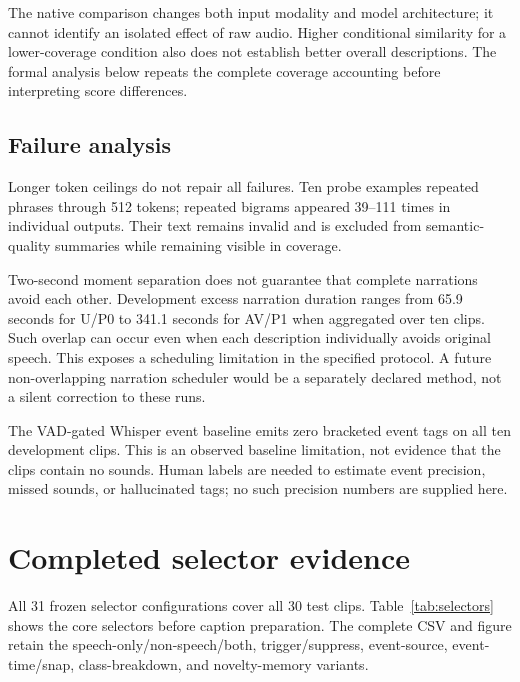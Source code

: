 \documentclass[10pt,twocolumn]{article}
\begin{document}
The native comparison changes both input modality and model architecture; it cannot identify an isolated effect of raw audio. Higher conditional similarity for a lower-coverage condition also does not establish better overall descriptions. The formal analysis below repeats the complete coverage accounting before interpreting score differences.

\subsection{Failure analysis}
Longer token ceilings do not repair all failures. Ten probe examples repeated phrases through 512 tokens; repeated bigrams appeared 39--111 times in individual outputs. Their text remains invalid and is excluded from semantic-quality summaries while remaining visible in coverage.

Two-second moment separation does not guarantee that complete narrations avoid each other. Development excess narration duration ranges from 65.9 seconds for U/P0 to 341.1 seconds for AV/P1 when aggregated over ten clips. Such overlap can occur even when each description individually avoids original speech. This exposes a scheduling limitation in the specified protocol. A future non-overlapping narration scheduler would be a separately declared method, not a silent correction to these runs.

The VAD-gated Whisper event baseline emits zero bracketed event tags on all ten development clips. This is an observed baseline limitation, not evidence that the clips contain no sounds. Human labels are needed to estimate event precision, missed sounds, or hallucinated tags; no such precision numbers are supplied here.

\section{Completed selector evidence}
All 31 frozen selector configurations cover all 30 test clips. Table~\ref{tab:selectors} shows the core selectors before caption preparation. The complete CSV and figure retain the speech-only/non-speech/both, trigger/suppress, event-source, event-time/snap, class-breakdown, and novelty-memory variants.

\begin{table}[h]
\centering\small

\caption{Heldout selector agreement, before caption generation. O is a reference timestamp upper bound. Scores are descriptive clip means.}\label{tab:selectors}
\end{table}
\end{document}
